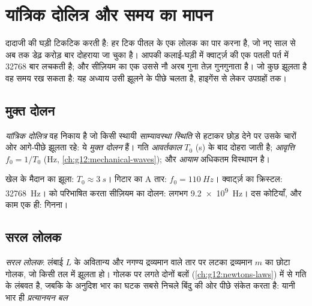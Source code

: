 \chapter{यांत्रिक दोलित्र और समय का मापन}\label{ch:g12:oscillators-and-time}

दादाजी की घड़ी टिकटिक करती है: हर टिक पीतल के एक लोलक का  पार करना है,
जो नए साल से अब तक डेढ़ करोड़ बार दोहराया जा चुका है। आपकी कलाई-घड़ी में क्वार्ट्ज़
की एक पतली पर्त  में \num{32768} बार लचकती है; और सीज़ियम का एक 
उससे नौ अरब गुना तेज़ गुनगुनाता है। जो कुछ झूलता है वह समय रख सकता है: यह
अध्याय उसी झूलने के पीछे चलता है, हाइगेंस से लेकर उपग्रहों तक।

\section{मुक्त दोलन}

\begin{definition}[दोलित्र, आवर्तकाल, आवृत्ति, आयाम]\label{def:g12:oscillators-and-time:oscillator}
\emph{यांत्रिक दोलित्र} वह निकाय है जो किसी स्थायी
\emph{साम्यावस्था स्थिति} से हटाकर छोड़ देने पर उसके
चारों ओर आगे-पीछे झूलता रहे: ये \emph{मुक्त दोलन} हैं। गति
\emph{आवर्तकाल} $T_0$ (\unit{s}) के बाद दोहरा जाती है;
\emph{आवृत्ति} $f_0 = 1/T_0$ (\unit{Hz}, \cref{ch:g12:mechanical-waves}); और
\emph{आयाम} अधिकतम विस्थापन है।
\end{definition}

\begin{example}[दोलित्रों का चिड़ियाघर]\label{ex:g12:oscillators-and-time:zoo}
खेल के मैदान का झूला: $T_0 \approx \qty{3}{s}$। गिटार का A तार: $f_0 = \qty{110}{Hz}$। क्वार्ट्ज़ का क्रिस्टल:
\qty{32768}{Hz}।  को परिभाषित करता सीज़ियम का दोलन: लगभग \qty{9.2e9}{Hz}। दस कोटियाँ, और
काम एक ही: गिनना।
\end{example}

\section{सरल लोलक}

\begin{definition}[सरल लोलक]\label{def:g12:oscillators-and-time:pendulum}
\emph{सरल लोलक}: लंबाई $L$ के अवितान्य और नगण्य द्रव्यमान
वाले तार पर लटका द्रव्यमान $m$ का छोटा गोलक, जो किसी  तल में
झूलता हो। गोलक पर लगते दोनों बलों (\cref{ch:g12:newtons-laws}) में से  गति के
लंबवत है, जबकि  के अनुदिश भार का घटक सबसे निचले बिंदु की
ओर पीछे संकेत करता है: यानी भार ही \emph{प्रत्यानयन
बल}%
\end{definition}

